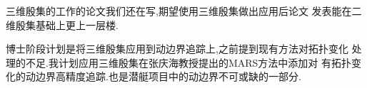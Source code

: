 \documentclass[UTF8]{ctexbeamer}	%
\theoremstyle{plain}
\theoremstyle{definition}
\theoremstyle{remark}
\numberwithin{equation}{section}
\begin{document}
\begin{frame}
  三维殷集的工作的论文我们还在写,期望使用三维殷集做出应用后论文
  发表能在二维殷集基础上更上一层楼.
\end{frame}

\begin{frame}
  博士阶段计划是将三维殷集应用到动边界追踪上,之前提到现有方法对拓扑变化
  处理的不足.我计划应用三维殷集在张庆海教授提出的MARS方法中添加对
  有拓扑变化的动边界高精度追踪.也是潜艇项目中的动边界不可或缺的一部分.
\end{frame}

\end{document}
